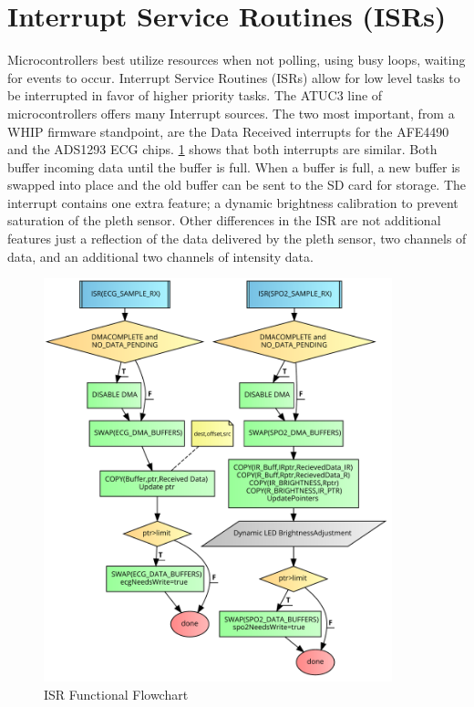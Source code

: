 \section {Interrupt Service Routines (ISRs)}
Microcontrollers best utilize resources when not polling, using busy loops, waiting for events to occur. Interrupt Service Routines (ISRs) allow for low level tasks to be interrupted in favor of higher priority tasks. The ATUC3 line of microcontrollers offers many Interrupt sources. The two most important, from a WHIP firmware standpoint, are the Data Received interrupts for the AFE4490  and the ADS1293 ECG chips. \cref{fig:flowchart_ISR} shows that both interrupts are similar. Both buffer incoming data until the buffer is full. When a buffer is full, a new buffer is swapped into place and the old buffer can be sent to the SD card for storage. The  interrupt contains one extra feature; a dynamic brightness calibration to prevent saturation of the pleth sensor. Other differences in the  ISR are not additional features just a reflection of the data delivered by the pleth sensor, two channels of data, and an additional two channels of intensity data.
\begin{figure}
	\begin{center}
		\includegraphics[scale=1,width=0.9\textwidth]{Images/FlowChartISR.pdf} 
		\caption{ISR Functional Flowchart}
		\label{fig:flowchart_ISR}
	\end{center}
\end{figure}

